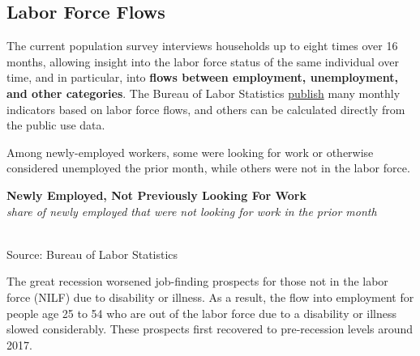 \documentclass{report}
\makeatletter
\newcommand{\tbllink}[1]{\href{https://raw.githubusercontent.com/bdecon/US-chartbook/master/chartbook/data/#1}{\faTable}}
\newcommand*\short[1]{\expandafter\@gobbletwo\number\numexpr#1\relax}
\newcommand{\dateaxisticks}{
		date coordinates in=x, axis line style={draw=none},
		xmax={2023-10-01},
		max space between ticks=40,	    
		xtick={{1990-01-01}, {1992-01-01}, {1994-01-01}, 
			{1996-01-01}, {1998-01-01}, {2000-01-01}, 
			{2002-01-01}, {2004-01-01}, {2006-01-01},
			{2008-01-01}, {2010-01-01}, {2012-01-01}, {2014-01-01},
		    {2016-01-01}, {2018-01-01}, {2020-01-01}, {2022-01-01}, 
		    {2024-01-01}, {2026-01-01}},
		minor xtick={{1989-01-01}, {1991-01-01}, {1993-01-01},
			{1995-01-01}, {1997-01-01}, {1999-01-01}, 
			{2001-01-01}, {2003-01-01}, {2005-01-01}, {2007-01-01},
		    {2009-01-01}, {2011-01-01}, {2013-01-01}, {2015-01-01},
		    {2017-01-01}, {2019-01-01}, {2021-01-01}, {2023-01-01}, 
		    {2025-01-01}, {2027-01-01}},
		enlarge y limits={0.06}, enlarge x limits={0.01},
		}
\newcommand{\bbar}[2]{extra #1 ticks = {{#2}}, extra #1 tick labels = ,
		extra #1 tick style = {grid=major, grid style={thick, black!25}},}
\newcommand{\stdline}[4]{\addplot[very thick, no markers, color=#1] 
		table [x=#2, y=#3, col sep=comma] {#4};	}
\newcommand{\thickline}[4]{\addplot[ultra thick, no markers, color=#1] 
		table [x=#2, y=#3, col sep=comma] {#4};	}
\newcommand{\rbars}{
		\fill[color=black!10] (axis cs:{1990-07-01},\pgfkeysvalueof{/pgfplots/ymin}) rectangle 
			(axis cs:{1991-03-01}, \pgfkeysvalueof{/pgfplots/ymax});
		\fill[color=black!10] (axis cs:{2007-12-01},\pgfkeysvalueof{/pgfplots/ymin}) rectangle 
			(axis cs:{2009-07-01}, \pgfkeysvalueof{/pgfplots/ymax});
		\fill[color=black!10] (axis cs:{2001-03-01},\pgfkeysvalueof{/pgfplots/ymin}) rectangle 
			(axis cs:{2001-11-01}, \pgfkeysvalueof{/pgfplots/ymax});
		\fill[color=black!10] (axis cs:{2020-02-01},\pgfkeysvalueof{/pgfplots/ymin}) rectangle 
			(axis cs:{2020-05-01}, \pgfkeysvalueof{/pgfplots/ymax});}
\makeatother
\begin{document}
{\newpage
\hypertarget{labf}{\label{labf}}
\begin{minipage}{0.76\textwidth}  
\subsection*{Labor Force Flows}
\small The current population survey interviews households up to eight times over 16 months, allowing insight into the labor force status of the same individual over time, and in particular, into \textbf{flows between employment, unemployment, and other categories}. The Bureau of Labor Statistics \href{https://www.bls.gov/cps/cps_flows.htm}{publish} many monthly indicators based on labor force flows, and others can be calculated directly from the public use data.

Among newly-employed workers, some were looking for work or otherwise considered unemployed the prior month, while others were not in the labor force.  
\vspace{2mm}

\normalsize \textbf{Newly Employed, Not Previously Looking For Work}\\
\footnotesize{\textit{share of newly employed that were not looking for work in the prior month}}\\
\hspace*{-2mm} \\
\footnotesize{Source: Bureau of Labor Statistics} \hfill \tbllink{lf_flow.csv} \ \tbllink{lf_flow_q.csv}
\vspace{4mm}

\small The great recession worsened job-finding prospects for those not in the labor force (NILF) due to disability or illness. As a result, the flow into employment for people age 25 to 54 who are out of the labor force due to a disability or illness slowed considerably. These prospects first recovered to pre-recession levels around 2017. 
\end{minipage}

}
\end{document}
